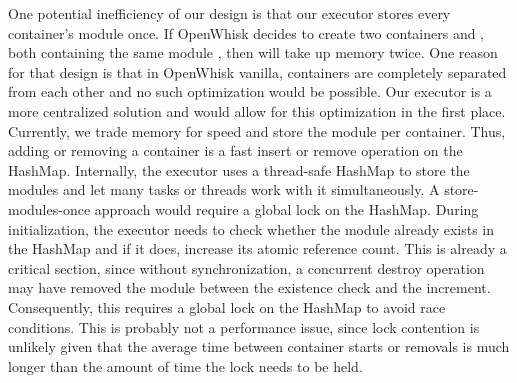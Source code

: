 One potential inefficiency of our design is that our executor stores every container's module once. If OpenWhisk decides to create two containers  and , both containing the same module , then  will take up memory twice. One reason for that design is that in OpenWhisk vanilla, containers are completely separated from each other and no such optimization would be possible. Our executor is a more centralized solution and would allow for this optimization in the first place. Currently, we trade memory for speed and store the module per container. Thus, adding or removing a container is a fast insert or remove operation on the HashMap.
Internally, the executor uses a thread-safe HashMap to store the modules and let many tasks or threads work with it simultaneously. A store-modules-once approach would require a global lock on the HashMap. During initialization, the executor needs to check whether the module already exists in the HashMap and if it does, increase its atomic reference count. This is already a critical section, since without synchronization, a concurrent destroy operation may have removed the module between the existence check and the increment. Consequently, this requires a global lock on the HashMap to avoid race conditions. This is probably not a performance issue, since lock contention is unlikely given that the average time between container starts or removals is much longer than the amount of time the lock needs to be held.

